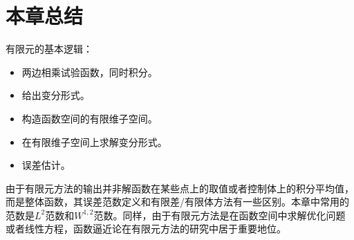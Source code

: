 \section{本章总结}
有限元的基本逻辑：
\begin{itemize}
  \item 两边相乘试验函数，同时积分。
  \item 给出变分形式。
  \item 构造函数空间的有限维子空间。
  \item 在有限维子空间上求解变分形式。
  \item 误差估计。
\end{itemize}
由于有限元方法的输出并非解函数在某些点上的取值或者控制体上的积分平均值，而是整体函数，其误差范数定义和有限差/有限体方法有一些区别。本章中常用的范数是$L^{2}$范数和$W^{1,2}$范数。同样，由于有限元方法是在函数空间中求解优化问题或者线性方程，函数逼近论在有限元方法的研究中居于重要地位。